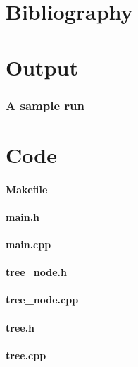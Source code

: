 \documentclass[12pt]{article}
\begin{document}
\part{Bibliography}


\part{Output}
\section{A sample run}




\part{Code}
\footnotesize
\subsection{Makefile}


\subsection{main.h}


\subsection{main.cpp}


\subsection{tree\_node.h}


\subsection{tree\_node.cpp}


\subsection{tree.h}


\subsection{tree.cpp}
\label{sec:tree.cpp}

\end{document}
